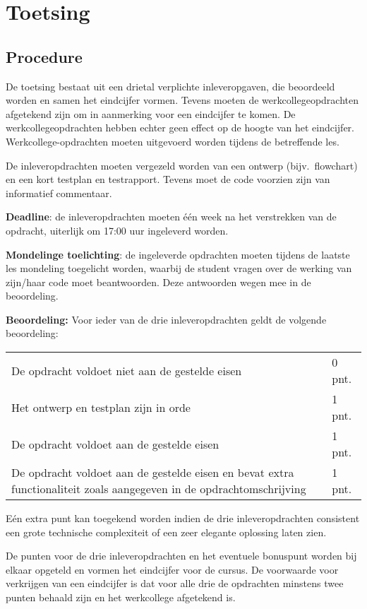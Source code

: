 \documentclass{cursushandleiding}
\begin{document}
\section{Toetsing}
\subsection{Procedure}
De toetsing bestaat uit een drietal verplichte inleveropgaven, die beoordeeld worden en samen het eindcijfer vormen. Tevens moeten de werkcollegeopdrachten afgetekend zijn om in aanmerking voor een eindcijfer te komen. De werkcollegeopdrachten hebben echter geen effect op de hoogte van het eindcijfer. Werkcollege-opdrachten moeten uitgevoerd worden tijdens de betreffende les.

De inleveropdrachten moeten vergezeld worden van een ontwerp (bijv.\ flowchart) en een kort testplan en testrapport. Tevens moet de code voorzien zijn van informatief commentaar.

\textbf{Deadline}: de inleveropdrachten moeten \'e\'en week na het verstrekken van de opdracht, uiterlijk om 17:00 uur ingeleverd worden.

\textbf{Mondelinge toelichting}: de ingeleverde opdrachten moeten tijdens de laatste les mondeling toegelicht worden, waarbij de student vragen over de werking van zijn/haar code moet beantwoorden. Deze antwoorden wegen mee in de beoordeling.

\textbf{Beoordeling:} Voor ieder van de drie inleveropdrachten geldt de volgende beoordeling:

\begin{tabular}{p{10cm}l}
\hline
De opdracht voldoet niet aan de gestelde eisen & 0 pnt.\\
Het ontwerp en testplan zijn in orde & 1 pnt.\\
De opdracht voldoet aan de gestelde eisen & 1 pnt.\\
De opdracht voldoet aan de gestelde eisen en bevat extra functionaliteit zoals aangegeven in de opdrachtomschrijving & 1 pnt.\\
\hline
\end{tabular}

E\'en extra punt kan toegekend worden indien de drie inleveropdrachten consistent een grote technische complexiteit of een zeer elegante oplossing laten zien.

De punten voor de drie inleveropdrachten en het eventuele bonuspunt worden bij elkaar opgeteld en vormen het eindcijfer voor de cursus. De voorwaarde voor verkrijgen van een eindcijfer is dat voor alle drie de opdrachten minstens twee punten behaald zijn en het werkcollege afgetekend is.
%
\end{document}
